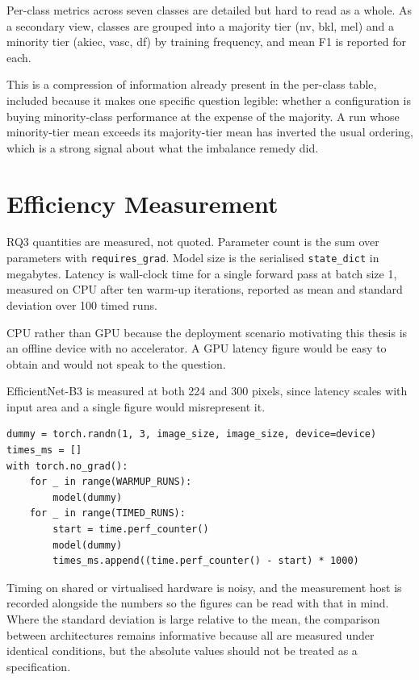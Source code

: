 Per-class metrics across seven classes are detailed but hard to read as a whole. As a
secondary view, classes are grouped into a majority tier (nv, bkl, mel) and a minority
tier (akiec, vasc, df) by training frequency, and mean F1 is reported for each.

This is a compression of information already present in the per-class table, included
because it makes one specific question legible: whether a configuration is buying
minority-class performance at the expense of the majority. A run whose minority-tier
mean exceeds its majority-tier mean has inverted the usual ordering, which is a strong
signal about what the imbalance remedy did.

\section{Efficiency Measurement}
\label{sec:eval-efficiency}

RQ3 quantities are measured, not quoted. Parameter count is the sum over parameters with
\texttt{requires\_grad}. Model size is the serialised \texttt{state\_dict} in megabytes.
Latency is wall-clock time for a single forward pass at batch size 1, measured on CPU
after ten warm-up iterations, reported as mean and standard deviation over 100 timed
runs.

CPU rather than GPU because the deployment scenario motivating this thesis is an offline
device with no accelerator. A GPU latency figure would be easy to obtain and would not
speak to the question.

EfficientNet-B3 is measured at both 224 and 300 pixels, since latency scales with input
area and a single figure would misrepresent it.

\begin{lstlisting}[caption={Latency measurement, \texttt{scripts/benchmark\_efficiency.py}.},
                   label={lst:latency}]
dummy = torch.randn(1, 3, image_size, image_size, device=device)
times_ms = []
with torch.no_grad():
    for _ in range(WARMUP_RUNS):
        model(dummy)
    for _ in range(TIMED_RUNS):
        start = time.perf_counter()
        model(dummy)
        times_ms.append((time.perf_counter() - start) * 1000)
\end{lstlisting}

Timing on shared or virtualised hardware is noisy, and the measurement host is recorded
alongside the numbers so the figures can be read with that in mind. Where the standard
deviation is large relative to the mean, the comparison between architectures remains
informative because all are measured under identical conditions, but the absolute values
should not be treated as a specification.

